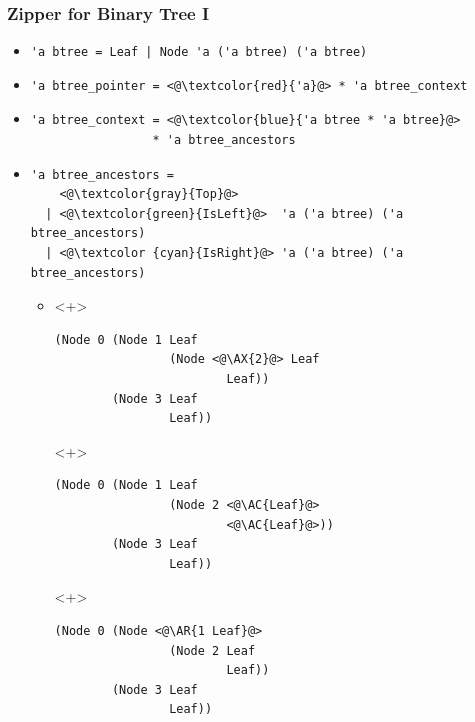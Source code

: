 \begin{frame}[fragile]
\frametitle{Zipper for Binary Tree I}

\begin{itemize}
\item \lstinline.'a btree = Leaf | Node 'a ('a btree) ('a btree).

\item
\begin{lstlisting}
'a btree_pointer = <@\textcolor{red}{'a}@> * 'a btree_context
\end{lstlisting}

\item
\begin{lstlisting}
'a btree_context = <@\textcolor{blue}{'a btree * 'a btree}@>
                 * 'a btree_ancestors
\end{lstlisting}

\item
\begin{lstlisting}
'a btree_ancestors =
    <@\textcolor{gray}{Top}@>
  | <@\textcolor{green}{IsLeft}@>  'a ('a btree) ('a btree_ancestors)
  | <@\textcolor {cyan}{IsRight}@> 'a ('a btree) ('a btree_ancestors)
\end{lstlisting}

\newcommand{\AX}[1]{\textcolor{red}{#1}}
\newcommand{\AC}[1]{\textcolor{blue}{#1}}
\newcommand{\AL}[1]{\textcolor{green}{#1}}
\newcommand{\AR}[1]{\textcolor{cyan}{#1}}
\newcommand{\AT}[1]{\textcolor{gray}{#1}}
\begin{itemize}
	\item
\begin{onlyenv}<+>
\begin{lstlisting}
(Node 0 (Node 1 Leaf
                (Node <@\AX{2}@> Leaf
                        Leaf))
        (Node 3 Leaf
                Leaf))
\end{lstlisting}
\end{onlyenv}

\begin{onlyenv}<+>
\begin{lstlisting}
(Node 0 (Node 1 Leaf
                (Node 2 <@\AC{Leaf}@>
                        <@\AC{Leaf}@>))
        (Node 3 Leaf
                Leaf))
\end{lstlisting}
\end{onlyenv}

\begin{onlyenv}<+>
\begin{lstlisting}
(Node 0 (Node <@\AR{1 Leaf}@>
                (Node 2 Leaf
                        Leaf))
        (Node 3 Leaf
                Leaf))
\end{lstlisting}
\end{onlyenv}


\end{itemize}
\end{itemize}
\end{frame}
